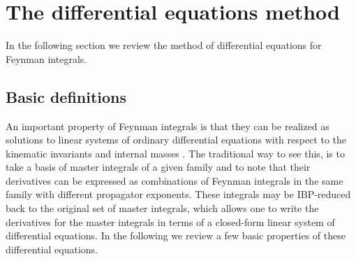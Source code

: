 \documentclass{article}
\begin{document}
\section{The differential equations method}
\label{sec:differentialequations}
In the following section we review the method of differential equations for Feynman integrals. 

\subsection{Basic definitions}
An important property of Feynman integrals is that they can be realized as solutions to linear systems of ordinary differential equations with respect to the kinematic invariants and internal masses \cite{Kotikov:1990kg, Kotikov:1991pm, Kotikov:1991hm}. The traditional way to see this, is to take a basis of master integrals of a given family and to note that their derivatives can be expressed as combinations of Feynman integrals in the same family with different propagator exponents. These integrals may be IBP-reduced back to the original set of master integrals, which allows one to write the derivatives for the master integrals in terms of a closed-form linear system of differential equations. In the following we review a few basic properties of these differential equations.
\end{document}
